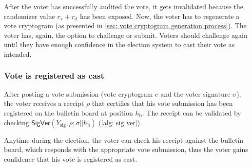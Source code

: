 After the voter has successfully audited the vote, it gets invalidated because the randomizer value $r_\mathrm{v} + r_\mathrm{d}$ has been exposed. Now, the voter has to regenerate a vote cryptogram (as presented in \cref{sec: vote cryptogram generation process}). The voter has, again, the option to challenge or submit. Voters should challenge again until they have enough confidence in the election system to cast their vote as intended.

 
\subsubsection{Vote is registered as cast} \label{sec: vote is registered as cast}
After posting a vote submission (vote cryptogram $e$ and the voter signature $\sigma$), the voter receives a receipt $\rho$ that certifies that his vote submission has been registered on the bulletin board at position $h_\mathrm{b}$. The receipt can be validated by checking \( \mathsf{SigVer} (Y_\mathrm{sig}, \rho; \sigma || h_\mathrm{b}) \) (\cref{alg: sig ver}).

Anytime during the election, the voter can check his receipt against the bulletin board, which responds with the appropriate vote submission, thus the voter gains confidence that his vote is registered as cast.
